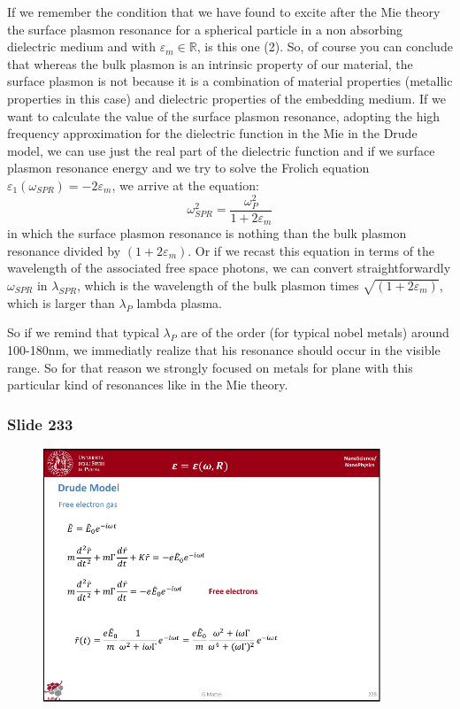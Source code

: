 \documentclass[../main/main.tex]{subfiles}
\begin{document}
If we remember the condition that we have found to excite after the Mie theory the surface plasmon resonance for a spherical particle in a non absorbing dielectric medium and with \( \varepsilon _m \in \mathbb{R} \), is this one (2). So, of course you can conclude that  whereas the bulk plasmon is an intrinsic property of our material, the surface plasmon is not because it is a combination of material properties (metallic properties in this case) and dielectric properties of the embedding medium. If we want to calculate the value of the surface plasmon resonance, adopting the high frequency approximation for the dielectric function in the Mie in the Drude model, we can use just the real part of the dielectric function and if we surface plasmon resonance energy and we try to solve the Frolich equation \( \varepsilon _1 (\omega _{SPR}) = - 2 \varepsilon _m \), we arrive at the equation:
\begin{equation*}
  \omega _{SPR}^2 = \frac{\omega _P^2}{1 + 2 \varepsilon _m}
\end{equation*}
in which the surface plasmon resonance is nothing than the bulk plasmon resonance divided by \( (1+ 2 \varepsilon _m) \). Or if we recast this equation in terms of the wavelength of the associated free space photons, we can convert straightforwardly  \( \omega _{SPR} \) in \( \lambda _{SPR} \), which is the wavelength of the bulk plasmon times \( \sqrt{ (1+ 2 \varepsilon _m)} \), which is larger than \( \lambda _P \) lambda plasma.

So if we remind that typical \( \lambda _P \) are of the order (for typical nobel metals) around 100-180nm, we immediatly realize that his resonance should occur in the visible range. So for that reason we strongly focused on metals for plane with this particular kind of resonances like in the Mie theory.


\newpage

\subsubsection{Slide 233}

\begin{figure}[h!]
\centering
\includegraphics[page=6,width=0.9\textwidth]{../lessons/pdf_file/15_lesson.pdf}
\end{figure}
\end{document}
